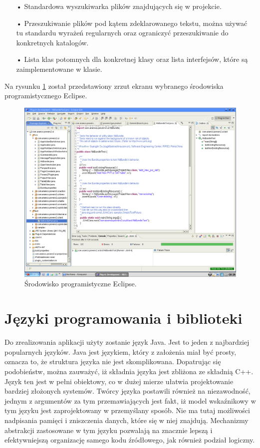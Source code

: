\begin{itemize}
\item[•]{Standardowa wyszukiwarka plików znajdujących się w projekcie.}
\item[•]{Przeszukiwanie plików pod kątem zdeklarowanego tekstu, można używać tu standardu wyrażeń regularnych oraz ograniczyć przeszukiwanie do konkretnych katalogów.}
\item[•]{Lista klas potomnych dla konkretnej klasy oraz lista interfejsów, które są zaimplementowane w klasie.}
\end{itemize}


Na rysunku \ref{eclipse} został przedstawiony zrzut ekranu wybranego środowiska programistycznego Eclipse.


\begin{figure}[h!]
  \centering
  \includegraphics[width=0.5\linewidth]{rys/eclipse1}
  \caption{Środowisko programistyczne Eclipse.}
  \label{eclipse}
\end{figure}

\section{{Języki programowania i biblioteki}}

Do zrealizowania aplikacji użyty zostanie język Java. Jest to jeden z najbardziej popularnych języków. 
Java \cite{horstmann} jest językiem, który z założenia miał być prosty, oznacza to, że struktura języka nie jest skomplikowana. Dopatrując się podobieństw, można zauważyć, iż składnia języka jest zbliżona ze składnią C++.  Język ten jest w pełni obiektowy, co w dużej mierze ułatwia projektowanie bardziej złożonych systemów. Twórcy języka postawili również na niezawodność, jednym z argumentów za tym przemawiających jest fakt, iż model wskaźnikowy w tym języku jest zaprojektowany w przemyślany sposób. Nie ma tutaj możliwości nadpisania pamięci i zniszczenia danych, które się w niej znajdują. Mechanizmy abstrakcji zastosowane w tym języku pozwalają na znacznie lepszą i efektywniejszą organizację samego kodu źródłowego, jak również podział logiczny. 


